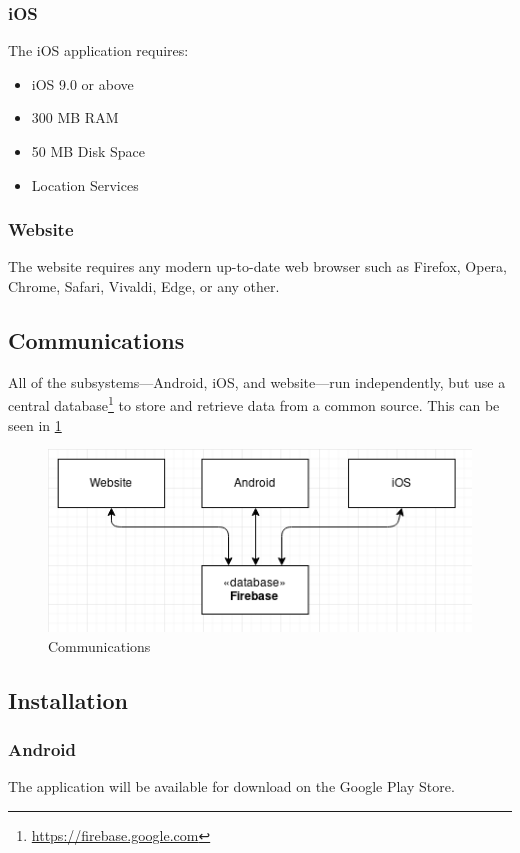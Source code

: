 \documentclass[11pt]{article}
\begin{document}
\subsubsection{iOS}
The iOS application requires:
\begin{itemize}
 \item iOS 9.0 or above
 \item 300 MB RAM
 \item 50 MB Disk Space
 \item Location Services
\end{itemize}
\subsubsection{Website}
The website requires any modern up-to-date web browser such as Firefox, Opera, Chrome, Safari, Vivaldi, Edge, or any other.

\subsection{Communications}
All of the subsystems---Android, iOS, and website---run independently, but use a central database\footnote{\url{https://firebase.google.com}} to store and retrieve data from a common source. This can be seen in \ref{Communications}

\begin{figure}
 \centering
 \includegraphics[width=12cm, keepaspectratio]{Images/webDiagramCommunications.png}
 \caption{Communications}
 \label{Communications}
\end{figure}

\subsection{Installation}
\subsubsection{Android}
The application will be available for download on the Google Play Store.
\end{document}
